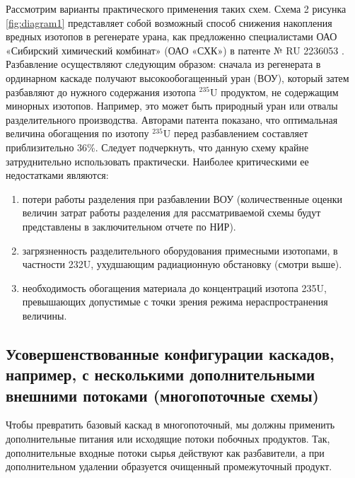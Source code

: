 Рассмотрим варианты практического применения таких схем. Схема 2 рисунка \ref{fig:diagram1} представляет собой возможный способ снижения накопления вредных изотопов в регенерате урана, как предложенно специалистами ОАО «Сибирский химический комбинат» (ОАО «СХК») в патенте № RU 2236053 \cite{SposobIzotopnogoVosstanovleniyaa}. Разбавление осуществляют следующим образом: сначала из регенерата в ординарном каскаде получают высокообогащенный уран (ВОУ), который затем разбавляют до нужного содержания изотопа $^{235}$U продуктом, не содержащим минорных изотопов. Например, это может быть природный уран или отвалы разделительного производства. Авторами патента показано, что оптимальная величина обогащения по изотопу $^{235}$U перед разбавлением составляет приблизительно 36\%. Следует подчеркнуть, что данную схему крайне затруднительно использовать практически. Наиболее критическими ее недостатками являются: 
\begin{enumerate}
  \item потери работы разделения при разбавлении ВОУ (количественные оценки величин затрат работы разделения для рассматриваемой схемы будут представлены в заключительном отчете по НИР).
  \item загрязненность разделительного оборудования примесными изотопами, в частности 232U, ухудшающим радиационную обстановку (смотри выше).
  \item необходимость обогащения материала до концентраций изотопа 235U, превышающих допустимые с точки зрения режима нераспространения величины.
\end{enumerate}



\subsection{Усовершенствованные конфигурации каскадов, например, с несколькими дополнительными внешними потоками (многопоточные схемы)}\label{sec:ch1/sec2.3}
Чтобы превратить базовый каскад в многопоточный, мы должны применить дополнительные питания или исходящие потоки побочных продуктов. Так, дополнительные входные потоки сырья действуют как разбавители, а при дополнительном удалении образуется очищенный промежуточный продукт.

